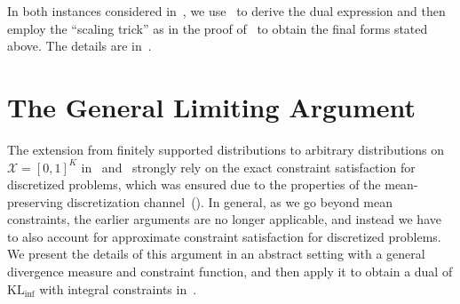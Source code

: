 \documentclass{article}
\theoremstyle{plain}
\theoremstyle{definition}
\newcommand{\KLinf}{\operatorname{KL_{inf}}}
\newcommand{\calX}{\mathcal X}
\begin{document}
    In both instances considered in~, we use~ to derive the dual expression and then employ the ``scaling trick'' as in the proof of~ to obtain the final forms stated above. The details are in~. 

\section{The General Limiting Argument}
\label{sec:general-argument-approximation-constraints}
The extension from finitely supported distributions to arbitrary distributions on $\calX = [0,1]^K$ in~ and~ strongly rely on the exact constraint satisfaction for discretized problems, which was ensured due to the properties of the mean-preserving discretization channel~(). In general, as we go beyond mean constraints, the earlier arguments are no longer applicable, and instead we have to also account for approximate constraint satisfaction for discretized problems. We present the details of this argument in an abstract setting with a general divergence measure and constraint function, and then apply it to obtain a dual of $\KLinf$ with integral constraints in~. 
\end{document}
